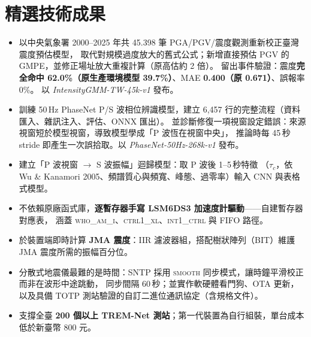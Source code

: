 \documentclass[10pt,a4paper]{article}
\begin{document}
\section{精選技術成果}

\begin{itemize}
  \item 以中央氣象署 2000–2025 年共 \num{45,398} 筆 PGA/PGV/震度觀測重新校正臺灣震度預估模型，
        取代對規模過度放大的舊式公式；新增直接預估 PGV 的 GMPE，並修正場址放大重複計算（原高估約 2 倍）。
        留出事件驗證：震度\textbf{完全命中 62.0\%（原生產環境模型 39.7\%）}、MAE \textbf{0.400（原 0.671）}、誤報率 0\%。
        以 \textit{IntensityGMM-TW-45k-v1} 發布。
  \item 訓練 50\,Hz PhaseNet P/S 波相位辨識模型，建立 6,457 行的完整流程（資料匯入、雜訊注入、評估、ONNX 匯出）。
        並診斷修復一項視窗設定錯誤：來源視窗短於模型視窗，導致模型學成「P 波恆在視窗中央」，
        推論時每 45\,秒 stride 即產生一次誤拾取。以 \textit{PhaseNet-50Hz-268k-v1} 發布。
  \item 建立「P 波視窗 $\rightarrow$ S 波振幅」迴歸模型：取 P 波後 1–5\,秒特徵
        （$\tau_c$，依 Wu \& Kanamori 2005、頻譜質心與頻寬、峰態、過零率）輸入 CNN 與表格式模型。
\end{itemize}

\begin{itemize}
  \item 不依賴原廠函式庫，\textbf{逐暫存器手寫 LSM6DS3 加速度計驅動}——自建暫存器對應表，
        涵蓋 \textsc{who\_am\_i}、\textsc{ctrl1\_xl}、\textsc{int1\_ctrl} 與 FIFO 路徑。
  \item 於裝置端即時計算 \textbf{JMA 震度}：IIR 濾波器組，搭配樹狀陣列（BIT）維護 JMA 震度所需的振幅百分位。
  \item 分散式地震儀最難的是時間：SNTP 採用 \textsc{smooth} 同步模式，讓時鐘平滑校正而非在波形中途跳動，
        同步間隔 60\,秒；並實作軟硬體看門狗、OTA 更新，以及具備 TOTP 測站驗證的自訂二進位通訊協定（含規格文件）。
  \item 支撐全臺 \textbf{200 個以上 TREM-Net 測站}；第一代裝置為自行組裝，單台成本低於新臺幣 800 元。
\end{itemize}
\end{document}
